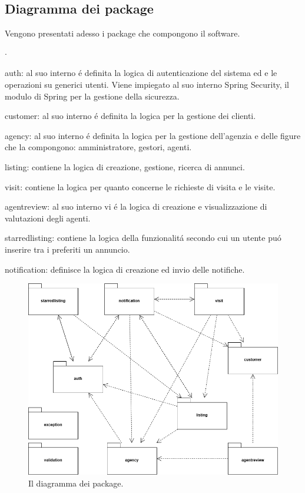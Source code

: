 \subsection{Diagramma dei package}
Vengono presentati adesso i package che compongono il software.
\begin{list}{$\cdot$}{}
    \item auth: al suo interno é definita la logica di autenticazione del sistema ed
    e le operazioni su generici utenti. Viene impiegato al suo interno Spring Security,
    il modulo di Spring per la gestione della sicurezza.
    \item customer: al suo interno é definita la logica per la gestione
    dei clienti.
    \item agency: al suo interno é definita la logica per la gestione
    dell'agenzia e delle figure che la compongono: amministratore, gestori, agenti.
    \item listing: contiene la logica di creazione, gestione, ricerca di annunci.
    \item visit: contiene la logica per quanto concerne le richieste di visita e 
    le visite.
    \item agentreview: al suo interno vi é la logica di creazione e visualizzazione di 
    valutazioni degli agenti.
    \item starredlisting: contiene la logica della funzionalitá secondo cui
    un utente puó inserire tra i preferiti un annuncio.
    \item notification: definisce la logica di creazione ed invio delle
    notifiche.
\end{list}

\begin{figure}[H]
    \centering
    \includegraphics[width=\textwidth]{assets/diagrams/class-diagram/package.png}
    \caption{Il diagramma dei package.}
    \label{fig:Diagramma dei package}
\end{figure}

